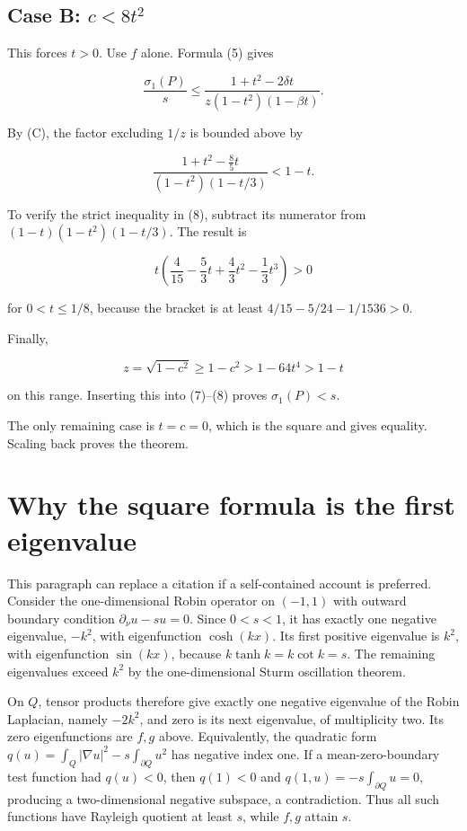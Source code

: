 \documentclass[11pt,a4paper]{article}
\begin{document}
\hypertarget{022-case-b-c8t2}{%
\subsection{\texorpdfstring{Case B:
\(c<8t^2\)}{Case B: c\textless8t\^{}2}}\label{022-case-b-c8t2}}

This forces \(t>0\). Use \(f\) alone. Formula (5) gives

\[
\frac{\sigma_1(P)}s
\le\frac{1+t^2-2\delta t}
{z(1-t^2)(1-\beta t)}.
\tag{7}
\]

By (C), the factor excluding \(1/z\) is bounded above by

\[
\frac{1+t^2-\frac85t}{(1-t^2)(1-t/3)}<1-t.
\tag{8}
\]

To verify the strict inequality in (8), subtract its numerator from
\((1-t)(1-t^2)(1-t/3)\). The result is

\[
t\left(\frac4{15}-\frac53t+\frac43t^2-\frac13t^3\right)>0
\]

for \(0<t\le 1/8\), because the bracket is at least \(4/15-5/24-1/1536>0\).

Finally,

\[
z=\sqrt{1-c^2}\ge1-c^2>1-64t^4>1-t
\]

on this range. Inserting this into (7)--(8) proves \(\sigma _1(P)<s\).

The only remaining case is \(t=c=0\), which is the square and gives
equality. Scaling back proves the theorem.

\hypertarget{022-why-the-square-formula-is-the-first-eigenvalue}{%
\section{Why the square formula is the first
eigenvalue}\label{022-why-the-square-formula-is-the-first-eigenvalue}}

This paragraph can replace a citation if a self-contained account is
preferred. Consider the one-dimensional Robin operator on \((-1,1)\)
with outward boundary condition \(\partial_\nu u-su=0\). Since
\(0<s<1\), it has exactly one negative eigenvalue, \(-k^2\), with
eigenfunction \(\cosh (kx)\). Its first positive eigenvalue is \(k^2\),
with eigenfunction \(\sin (kx)\), because \(k \tanh k=k \cot k=s\). The
remaining eigenvalues exceed \(k^2\) by the one-dimensional Sturm
oscillation theorem.

On \(Q\), tensor products therefore give exactly one negative eigenvalue
of the Robin Laplacian, namely \(-2k^2\), and zero is its next
eigenvalue, of multiplicity two. Its zero eigenfunctions are \(f,g\)
above. Equivalently, the quadratic form
\(q(u)=\int_Q|\nabla u|^2-s\int_{\partial Q}u^2\) has negative index
one. If a mean-zero-boundary test function had \(q(u)<0\), then
\(q(1)<0\) and \(q(1,u)=-s\int_{\partial Q}u=0\), producing a
two-dimensional negative subspace, a contradiction. Thus all such
functions have Rayleigh quotient at least \(s\), while \(f,g\) attain
\(s\).
\end{document}
